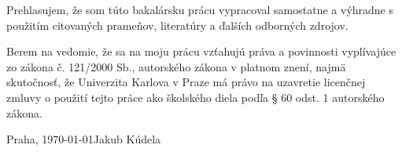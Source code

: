 
\vspace*{\fill}

\noindent
Prehlasujem, že som túto bakalársku prácu vypracoval samostatne a výhradne s použitím citovaných prameňov, literatúry a ďalších odborných zdrojov.

\medskip
\noindent
Berem na vedomie, že sa na moju prácu vzťahujú práva a povinnosti vyplívajúce zo zákona č. 121/2000 Sb., autorského zákona v platnom znení, najmä skutočnosť, že Univerzita Karlova v Praze má právo na uzavretie licenčnej zmluvy o použití tejto práce ako školského diela podľa § 60 odst. 1 autorského zákona.

\bigskip
\noindent
Praha, \today \hspace{\fill}Jakub Kúdela